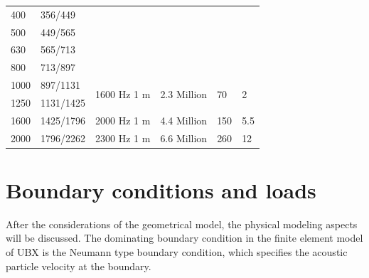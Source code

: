 \begin{table}[H]
\begin{tabularx}{\textwidth}{|X|X|c|X|X|X|}
		400                              & 356/449                    &                                 &                               &                         &                                        \\ \cline{1-2}
		500                              & 449/565                    &                                 &                               &                         &                                        \\ \cline{1-2}
		630                              & 565/713                    &                                 &                               &                         &                                        \\ \cline{1-2}
		800                              & 713/897                    &                                 &                               &                         &                                        \\ \hline
		1000                             & 897/1131                   & \multirow{2}{*}{1600 Hz 1 m}    & \multirow{2}{*}{2.3 Million}  & \multirow{2}{*}{70}     & \multirow{2}{*}{2}                     \\ \cline{1-2}
		1250                             & 1131/1425                  &                                 &                               &                         &                                        \\ \hline
		1600                             & 1425/1796                  & 2000 Hz 1 m                     & 4.4 Million                   & 150                     & 5.5                                    \\ \hline
		2000                             & 1796/2262                  & 2300 Hz 1 m                     & 6.6 Million                   & 260                     & 12                                     \\ \hline
	\end{tabularx}
\end{table}


\section{Boundary conditions and loads}
\label{section:boundary_conditions}

After the considerations of the geometrical model, the physical modeling aspects will be discussed. The dominating boundary condition in the finite element model of UBX is the Neumann type boundary condition, which specifies the acoustic particle velocity at the boundary.

